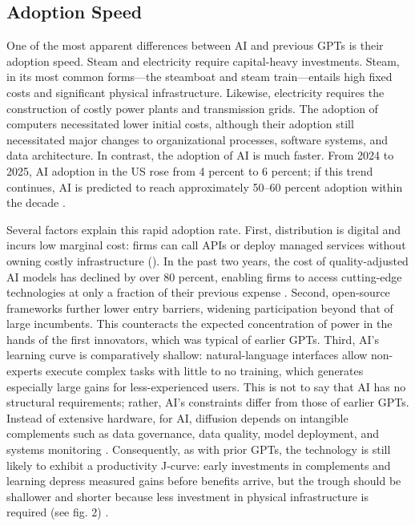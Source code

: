 \subsection{Adoption Speed}

One of the most apparent differences between AI and previous GPTs is their adoption speed. Steam and electricity require capital-heavy investments. Steam, in its most common forms—the steamboat and steam train—entails high fixed costs and significant physical infrastructure. Likewise, electricity requires the construction of costly power plants and transmission grids. The adoption of computers necessitated lower initial costs, although their adoption still necessitated major changes to organizational processes, software systems, and data architecture. In contrast, the adoption of AI is much faster. From 2024 to 2025, AI adoption in the US rose from 4 percent to 6 percent; if this trend continues, AI is predicted to reach approximately 50–60 percent adoption within the decade \autocite[p.\ 17]{FilippucciGalLaengleSchief2025OECDG7ProductivityGainsAI}.

Several factors explain this rapid adoption rate. First, distribution is digital and incurs low marginal cost: firms can call APIs or deploy managed services without owning costly infrastructure (\cites[p.\ 9]{ErdilBesiroglu2023ExplosiveGrowthAIAutomation}[p.\ 21]{BrynjolfssonRockSyverson2017AIModernProductivityParadox}). In the past two years, the cost of quality-adjusted AI models has declined by over 80 percent, enabling firms to access cutting-edge technologies at only a fraction of their previous expense \autocite[p.\ 8]{AndreBetinGalPeltier2025OECDIndicatorsAIMarkets}. Second, open-source frameworks further lower entry barriers, widening participation beyond that of large incumbents. This counteracts the expected concentration of power in the hands of the first innovators, which was typical of earlier GPTs. Third, AI’s learning curve is comparatively shallow: natural-language interfaces allow non-experts execute complex tasks with little to no training, which generates especially large gains for less-experienced \autocite[p.\ 17]{FilippucciGalLaengleSchief2025OECDG7ProductivityGainsAI} users. This is not to say that AI has no structural requirements; rather, AI’s constraints differ from those of earlier GPTs. Instead of extensive hardware, for AI, diffusion depends on intangible complements such as data governance, data quality, model deployment, and systems monitoring \autocite[pp.\ 4--10]{BrynjolfssonRockSyverson2017AIModernProductivityParadox}. Consequently, as with prior GPTs, the technology is still likely to exhibit a productivity J-curve: early investments in complements and learning depress measured gains before benefits arrive, but the trough should be shallower and shorter because less investment in physical infrastructure is required (see fig. 2) \autocite{BrynjolfssonRockSyverson2018ProductivityJCurve}.

